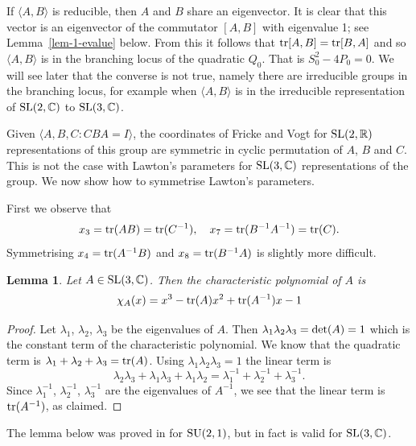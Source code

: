 \documentclass[11pt]{amsart}
\newtheorem{lemma}[theorem]{Lemma}
\numberwithin{equation}{section}
\begin{document}
If $\langle A,B\rangle$ is reducible, then $A$ and $B$ share an eigenvector. It is clear that this vector is an eigenvector
of the commutator $[A,B]$ with eigenvalue 1; see Lemma~\ref{lem-1-evalue} below. 
From this it follows that ${\rm tr}[A,B]={\rm tr}[B,A]$ and so
$\langle A,B\rangle$ is in the branching locus of the quadratic $Q_0$. That is $S_0^2-4P_0=0$. We will see later that
the converse is not true, namely there are irreducible groups in the branching locus, for example when $\langle A,B\rangle$
is in the irreducible representation of ${\rm SL}(2,{\mathbb C})$ to ${\rm SL}(3,{\mathbb C})$. 


\medskip

Given $\langle A,B,C:CBA=I\rangle$, the coordinates of Fricke and Vogt for ${\rm SL}(2,{\mathbb R})$ representations 
of this group are symmetric in cyclic permutation of $A$, $B$ and $C$. This is not the case with Lawton's parameters for 
${\rm SL}(3,{\mathbb C})$ representations of the group. We now show how to symmetrise Lawton's parameters.

First we observe that 
$$
x_3={\rm tr}(AB)={\rm tr}(C^{-1}),\quad x_7={\rm tr}(B^{-1}A^{-1})={\rm tr}(C).
$$
Symmetrising $x_4={\rm tr}(A^{-1}B)$ and $x_8={\rm tr}(B^{-1}A)$ is slightly more difficult.

\begin{lemma}\label{lem:char-poly}
	Let $A\in {\rm SL}(3,\mathbb{C})$. Then the characteristic polynomial of $A$ is 
	\begin{equation}\label{eqn:1.5}
		\chi_A(x)= x^3-{\rm tr}(A)x^2+{\rm tr}(A^{-1})x-1
	\end{equation}
\end{lemma}
\begin{proof}
	Let $\lambda_{1}$, $\lambda_{2}$, $\lambda_{3}$ be the eigenvalues of $A$. 
	Then $\lambda_{1}\lambda_{2}\lambda_{3}={\rm det}(A)=1$ which is the constant term of the characteristic polynomial. 
	We know that the quadratic term is $\lambda_{1}+\lambda_{2}+\lambda_{3}={\rm tr}(A)$. 
	Using $\lambda_{1}\lambda_{2}\lambda_{3}=1$  the linear term is
	$$
	\lambda_{2}\lambda_3+\lambda_{1}\lambda_{3}+\lambda_{1}\lambda_{2}
	=\lambda_1^{-1}+\lambda_{2}^{-1}+\lambda_{3}^{-1}.
	$$
	Since $\lambda_{1}^{-1}$, $\lambda_{2}^{-1}$, $\lambda_{3}^{-1}$ are the eigenvalues of $A^{-1}$, we see that
	the linear term is ${\rm tr}(A^{-1})$, as claimed.
	\end{proof}

The lemma below was proved in \cite{Par} for ${\rm SU}(2,1)$, but in fact is valid for ${\rm SL}(3,{\mathbb C})$.
\end{document}
